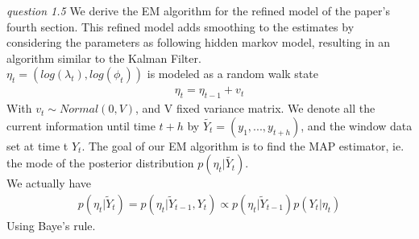 \documentclass[twoside]{article}
\begin{document}
\vspace{.2 in}
\textit{question 1.5} We derive the EM algorithm for the refined model of the paper's fourth section. This refined model adds smoothing to the estimates by considering the parameters as following hidden markov model, resulting in an algorithm similar to the Kalman Filter.\\

$\eta_t = (log(\lambda_t), log(\phi_t))$ is modeled as a random walk state
\begin{align*}
\eta_t = \eta_{t - 1} + v_t
\end{align*} 
With $v_t \sim Normal(0, V)$, and V fixed variance matrix. We denote all the current information until time $t + h$ by $\tilde{Y_{t}} = (y_1, ..., y_{t + h})$, and the window data set at time t $Y_t$. The goal of our EM algorithm is to find the MAP estimator, ie. the mode of the posterior distribution $p(\eta_t | \tilde{Y_{t}})$.\\

We actually have
\begin{align*}
p(\eta_t | \tilde{Y}_{t}) = p(\eta_t | \tilde{Y}_{t - 1}, Y_t) \propto p(\eta_t | \tilde{Y}_{t - 1}) p(Y_t | \eta_t)
\end{align*}
Using Baye's rule.



\end{document}
